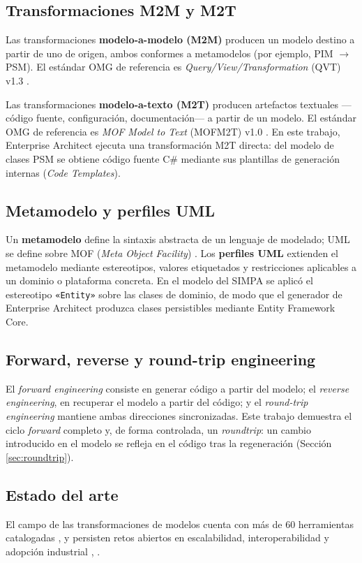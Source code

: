 \documentclass[11pt,a4paper]{article}
\begin{document}
	\subsection{Transformaciones M2M y M2T}
	Las transformaciones \textbf{modelo-a-modelo (M2M)} producen un modelo destino a partir de uno de origen, ambos conformes a metamodelos (por ejemplo, PIM $\rightarrow$ PSM). El estándar OMG de referencia es \textit{Query/View/Transformation} (QVT) v1.3 \cite{omg_qvt2016}.
	
	Las transformaciones \textbf{modelo-a-texto (M2T)} producen artefactos textuales —código fuente, configuración, documentación— a partir de un modelo. El estándar OMG de referencia es \textit{MOF Model to Text} (MOFM2T) v1.0 \cite{omg_mofm2t2008}. En este trabajo, Enterprise Architect ejecuta una transformación M2T directa: del modelo de clases PSM se obtiene código fuente C\# mediante sus plantillas de generación internas (\textit{Code Templates}).
	
	\subsection{Metamodelo y perfiles UML}
	Un \textbf{metamodelo} define la sintaxis abstracta de un lenguaje de modelado; UML se define sobre MOF (\textit{Meta Object Facility}) \cite{omg_uml2017}. Los \textbf{perfiles UML} extienden el metamodelo mediante estereotipos, valores etiquetados y restricciones aplicables a un dominio o plataforma concreta. En el modelo del SIMPA se aplicó el estereotipo \texttt{«Entity»} sobre las clases de dominio, de modo que el generador de Enterprise Architect produzca clases persistibles mediante Entity Framework Core.
	
	\subsection{Forward, reverse y round-trip engineering}
	El \textit{forward engineering} consiste en generar código a partir del modelo; el \textit{reverse engineering}, en recuperar el modelo a partir del código; y el \textit{round-trip engineering} mantiene ambas direcciones sincronizadas. Este trabajo demuestra el ciclo \textit{forward} completo y, de forma controlada, un \textit{roundtrip}: un cambio introducido en el modelo se refleja en el código tras la regeneración (Sección \ref{sec:roundtrip}).
	
	\subsection{Estado del arte}
	El campo de las transformaciones de modelos cuenta con más de 60 herramientas catalogadas \cite{kahani2019}, y persisten retos abiertos en escalabilidad, interoperabilidad y adopción industrial \cite{bucchiarone2020}, \cite{whittle2014}.
	
\end{document}
